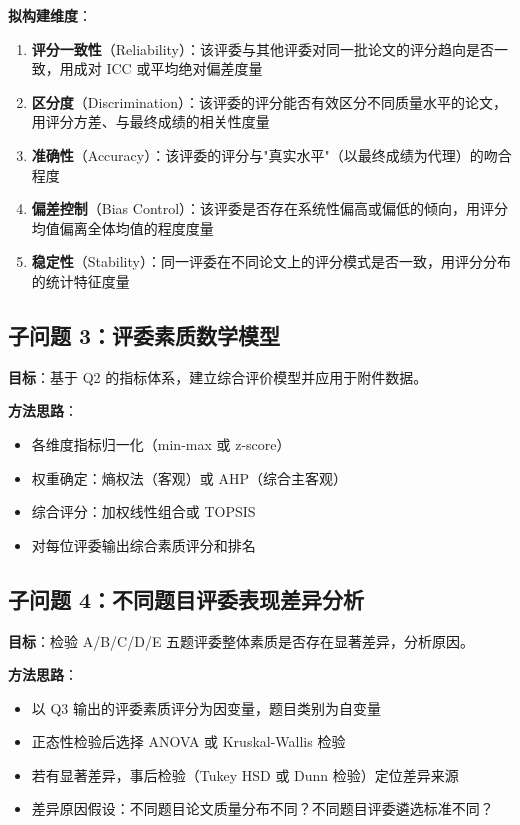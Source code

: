 \documentclass[UTF8]{ctexart}
\begin{document}
\textbf{拟构建维度}：
\begin{enumerate}
    \item \textbf{评分一致性}（Reliability）：该评委与其他评委对同一批论文的评分趋向是否一致，用成对 ICC 或平均绝对偏差度量
    \item \textbf{区分度}（Discrimination）：该评委的评分能否有效区分不同质量水平的论文，用评分方差、与最终成绩的相关性度量
    \item \textbf{准确性}（Accuracy）：该评委的评分与"真实水平"（以最终成绩为代理）的吻合程度
    \item \textbf{偏差控制}（Bias Control）：该评委是否存在系统性偏高或偏低的倾向，用评分均值偏离全体均值的程度度量
    \item \textbf{稳定性}（Stability）：同一评委在不同论文上的评分模式是否一致，用评分分布的统计特征度量
\end{enumerate}

\subsection{子问题 3：评委素质数学模型}

\textbf{目标}：基于 Q2 的指标体系，建立综合评价模型并应用于附件数据。

\textbf{方法思路}：
\begin{itemize}
    \item 各维度指标归一化（min-max 或 z-score）
    \item 权重确定：熵权法（客观）或 AHP（综合主客观）
    \item 综合评分：加权线性组合或 TOPSIS
    \item 对每位评委输出综合素质评分和排名
\end{itemize}

\subsection{子问题 4：不同题目评委表现差异分析}

\textbf{目标}：检验 A/B/C/D/E 五题评委整体素质是否存在显著差异，分析原因。

\textbf{方法思路}：
\begin{itemize}
    \item 以 Q3 输出的评委素质评分为因变量，题目类别为自变量
    \item 正态性检验后选择 ANOVA 或 Kruskal-Wallis 检验
    \item 若有显著差异，事后检验（Tukey HSD 或 Dunn 检验）定位差异来源
    \item 差异原因假设：不同题目论文质量分布不同？不同题目评委遴选标准不同？
\end{itemize}
\end{document}
